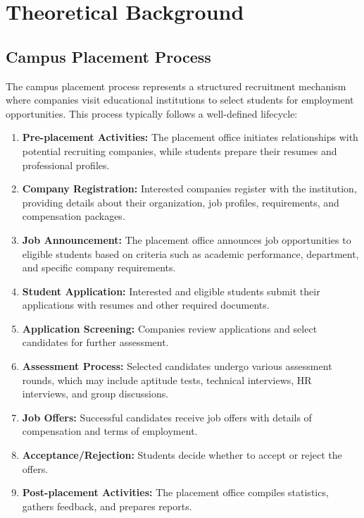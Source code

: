 \documentclass[12pt,a4paper]{report}
\begin{document}
\section{Theoretical Background}
\subsection{Campus Placement Process}
The campus placement process represents a structured recruitment mechanism where companies visit educational institutions to select students for employment opportunities. This process typically follows a well-defined lifecycle:

\begin{enumerate}
    \item \textbf{Pre-placement Activities:} The placement office initiates relationships with potential recruiting companies, while students prepare their resumes and professional profiles.
    
    \item \textbf{Company Registration:} Interested companies register with the institution, providing details about their organization, job profiles, requirements, and compensation packages.
    
    \item \textbf{Job Announcement:} The placement office announces job opportunities to eligible students based on criteria such as academic performance, department, and specific company requirements.
    
    \item \textbf{Student Application:} Interested and eligible students submit their applications with resumes and other required documents.
    
    \item \textbf{Application Screening:} Companies review applications and select candidates for further assessment.
    
    \item \textbf{Assessment Process:} Selected candidates undergo various assessment rounds, which may include aptitude tests, technical interviews, HR interviews, and group discussions.
    
    \item \textbf{Job Offers:} Successful candidates receive job offers with details of compensation and terms of employment.
    
    \item \textbf{Acceptance/Rejection:} Students decide whether to accept or reject the offers.
    
    \item \textbf{Post-placement Activities:} The placement office compiles statistics, gathers feedback, and prepares reports.
\end{enumerate}
\end{document}
